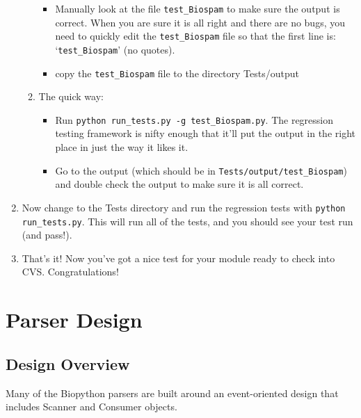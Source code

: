 \documentclass{report}
\begin{document}
\begin{enumerate}
\begin{enumerate}
\begin{itemize}
     \item Manually look at the file \verb|test_Biospam| to make sure the output is correct. When you are sure it is all right and there are no bugs, you need to quickly edit the \verb|test_Biospam| file so that the first line is: `\verb|test_Biospam|' (no quotes).

     \item copy the \verb|test_Biospam| file to the directory Tests/output
     
   \end{itemize}

   \item The quick way:

   \begin{itemize}
      \item Run \verb|python run_tests.py -g test_Biospam.py|. The
            regression testing framework is nifty enough that it'll put
            the output in the right place in just the way it likes it.   
       
       \item Go to the output (which should be in \verb|Tests/output/test_Biospam|) and double check the output to make sure it is all correct. 

   \end{itemize}

 \end{enumerate}
       
 \item Now change to the Tests directory and run the regression tests
       with \verb|python run_tests.py|. This will run all of the tests, and
       you should see your test run (and pass!).
       
  \item That's it! Now you've got a nice test for your module ready to check into CVS.
       Congratulations!
\end{enumerate}


\section{Parser Design}

\subsection{Design Overview}

Many of the Biopython parsers are built around an event-oriented design that includes
Scanner and Consumer objects.
\end{document}
